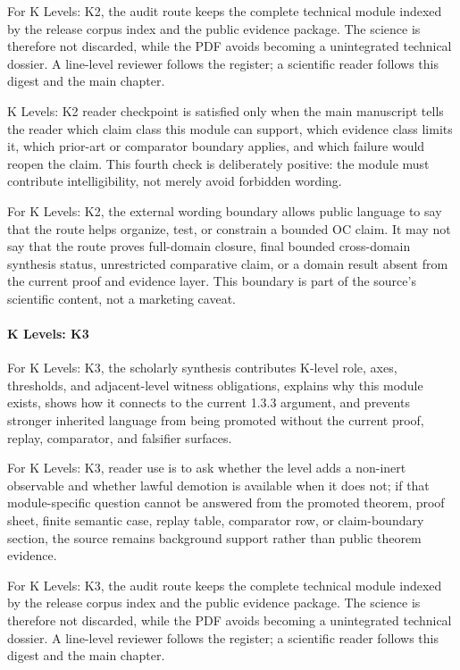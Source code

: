 For K Levels: K2, the audit route keeps the complete technical module indexed by the release corpus index and the public evidence package. The science is therefore not discarded, while the PDF avoids becoming a unintegrated technical dossier. A line-level reviewer follows the register; a scientific reader follows this digest and the main chapter.


K Levels: K2 reader checkpoint is satisfied only when the main manuscript tells the reader which claim class this module can support, which evidence class limits it, which prior-art or comparator boundary applies, and which failure would reopen the claim. This fourth check is deliberately positive: the module must contribute intelligibility, not merely avoid forbidden wording.


For K Levels: K2, the external wording boundary allows public language to say that the route helps organize, test, or constrain a bounded OC claim. It may not say that the route proves full-domain closure, final bounded cross-domain synthesis status, unrestricted comparative claim, or a domain result absent from the current proof and evidence layer. This boundary is part of the source's scientific content, not a marketing caveat.


\paragraph{K Levels: K3}

For K Levels: K3, the scholarly synthesis contributes K-level role, axes, thresholds, and adjacent-level witness obligations, explains why this module exists, shows how it connects to the current 1.3.3 argument, and prevents stronger inherited language from being promoted without the current proof, replay, comparator, and falsifier surfaces.


For K Levels: K3, reader use is to ask whether the level adds a non-inert observable and whether lawful demotion is available when it does not; if that module-specific question cannot be answered from the promoted theorem, proof sheet, finite semantic case, replay table, comparator row, or claim-boundary section, the source remains background support rather than public theorem evidence.


For K Levels: K3, the audit route keeps the complete technical module indexed by the release corpus index and the public evidence package. The science is therefore not discarded, while the PDF avoids becoming a unintegrated technical dossier. A line-level reviewer follows the register; a scientific reader follows this digest and the main chapter.


